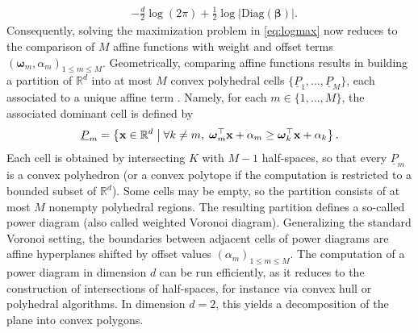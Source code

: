 \documentclass[review]{elsarticle}
\def\x{{\bf x}}
\begin{document}
{\begin{align}
& - \frac{d}{2}\log(2\pi) + \frac{1}{2}\log|\mathrm{Diag}(\boldsymbol{\beta})|. \nonumber
\end{align}
Consequently, solving the maximization problem in \eqref{eq:logmax} now reduces to the comparison of $M$ affine functions with weight and offset terms $(\boldsymbol{\omega}_m,\alpha_m)_{1 \leq m \leq M}$. Geometrically, comparing affine functions results in building a partition of $\mathbb{R}^d$ into at most $M$ convex polyhedral cells $\{\underline{P}_1,\dots,\underline{P}_M\}$, each associated to a unique affine term \cite{deBerg2008,Ziegler1995}. Namely, for each $m\in\{1,\dots,M\}$, the associated dominant cell is defined by
\begin{equation}
\label{eq:power_cell}
\underline{P}_m
=
\left\{
\x\in \mathbb{R}^d
\;\middle|\;
\forall k\neq m,\;
\boldsymbol{\omega}_m^\top \x+\alpha_m
\ge
\boldsymbol{\omega}_k^\top \x+\alpha_k
\right\}.
\end{equation}
Each cell is obtained by intersecting $K$ with $M-1$ half-spaces, so that every $\underline{P}_m$ is a convex polyhedron (or a convex polytope if the computation is restricted to a bounded subset of $\mathbb{R}^d$). Some cells may be empty, so the partition consists of at most $M$ nonempty polyhedral regions. The resulting partition defines a so-called power diagram (also called weighted Voronoi diagram). Generalizing the standard Voronoi setting, the boundaries between adjacent cells of power diagrams are affine hyperplanes shifted by offset values $(\alpha_m)_{1 \leq m \leq M}$. The computation of a power diagram in dimension $d$ can be run efficiently, as it reduces to the construction of intersections of half-spaces, for instance via convex hull or polyhedral algorithms. In dimension $d=2$, this yields a decomposition of the plane into convex polygons. 

}
\end{document}
